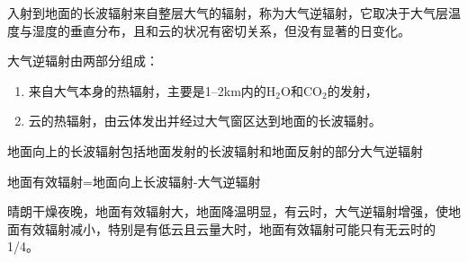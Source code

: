 \documentclass[UTF8,a4paper,11pt,oneside]{ctexbook}
\begin{document}
入射到地面的长波辐射来自整层大气的辐射，称为大气逆辐射，它取决于大气层温度与湿度的垂直分布，且和云的状况有密切关系，但没有显著的日变化。

大气逆辐射由两部分组成：
\begin{enumerate}
    \item 来自大气本身的热辐射，主要是1--2km内的\(\mathrm{H_2O}\)和\(\mathrm{CO_2}\)的发射，
    \item 云的热辐射，由云体发出并经过大气窗区达到地面的长波辐射。
\end{enumerate}

地面向上的长波辐射包括地面发射的长波辐射和地面反射的部分大气逆辐射

地面有效辐射=地面向上长波辐射-大气逆辐射

晴朗干燥夜晚，地面有效辐射大，地面降温明显，有云时，大气逆辐射增强，使地面有效辐射减小，特别是有低云且云量大时，地面有效辐射可能只有无云时的1/4。
\end{document}

